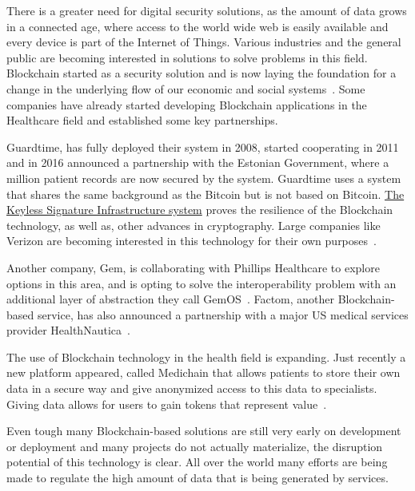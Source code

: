 There is a greater need for digital security solutions, as the amount of data
grows in a connected age, where access to the world wide web is easily
available and every device is part of the Internet of Things. Various
industries and the general public are becoming interested in solutions to solve
problems in this field. Blockchain started as a security solution and is now
laying the foundation for a change in the underlying flow of our economic and
social systems~\cite{Zago2018,Marr2018,Long2018}. Some companies have already
started developing Blockchain applications in the Healthcare field and
established some key partnerships.

Guardtime, has fully deployed their system in 2008, started cooperating in 2011
and in 2016 announced a partnership with the Estonian Government, where a
million patient records are now secured by the system. Guardtime uses a system
that shares the same background as the Bitcoin but is not based on Bitcoin.
\href{https://guardtime.com/technology}{The Keyless Signature Infrastructure
system} proves the resilience of the Blockchain technology, as well as, other
advances in cryptography. Large companies like Verizon are becoming interested
in this technology for their own
purposes~\cite{GuardTime2018,EstonianGovernmentGuardTime2016}.

Another company, Gem, is collaborating with Phillips Healthcare to explore
options in this area\cite{philips2016}, and is opting to solve the
interoperability problem with an additional layer of abstraction they call
GemOS~\cite{gemOS2018}. Factom, another Blockchain-based service, has also
announced a partnership with a major US medical services provider
HealthNautica~\cite{BlockchainCompHealth2017,FactomPartnership2017}.

The use of Blockchain technology in the health field is expanding. Just
recently a new platform appeared, called Medichain that allows patients to
store their own data in a secure way and give anonymized access to this data to
specialists. Giving data allows for users to gain tokens that represent
value~\cite{MediChain2018}.

Even tough many Blockchain-based solutions are still very early on development
or deployment and many projects do not actually materialize, the disruption
potential of this technology is clear. All over the world many efforts are
being made to regulate the high amount of data that is being generated by
services.

